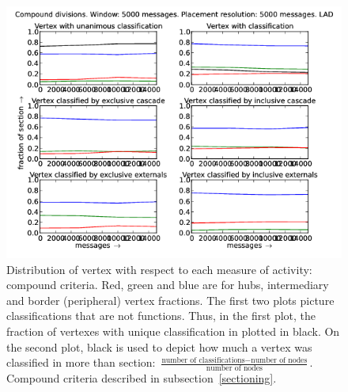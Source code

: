\documentclass[%
 aip,
 jmp,%
 amsmath,amssymb,
 reprint,%
]{revtex4-1}
\begin{document}
\begin{figure}[hbtp] 
   \centering
        \includegraphics[width=\textwidth]{figs/LAD/5000_2}
    \caption{Distribution of vertex with respect to each measure of activity: compound criteria. Red, green and blue are for hubs, intermediary and border (peripheral) vertex fractions. The first two plots picture classifications that are not functions. Thus, in the first plot, the fraction of vertexes with unique classification in plotted in black. On the second plot, black is used to depict how much a vertex was classified in more than section: $\frac{\text{number of classifications} - \text{number of nodes}}{\text{number of nodes}}$. Compound criteria described in subsection~\ref{sectioning}.}
    \label{fig:lad5000_}
\end{figure}
\end{document}
